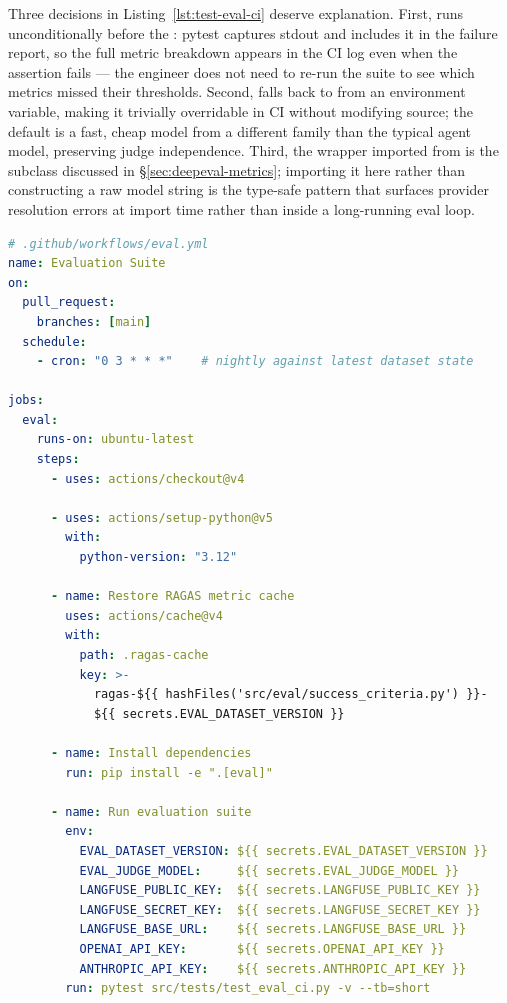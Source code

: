 Three decisions in Listing~\ref{lst:test-eval-ci} deserve explanation.
First,  runs unconditionally before the :
pytest captures stdout and includes it in the failure report, so the full
metric breakdown appears in the CI log even when the assertion fails --- the
engineer does not need to re-run the suite to see which metrics missed their
thresholds.  Second,  falls back to
 from an environment variable, making it trivially
overridable in CI without modifying source; the default is a fast, cheap
model from a different family than the typical agent model, preserving judge
independence.  Third, the  wrapper imported from
 is the  subclass discussed in
\S\ref{sec:deepeval-metrics}; importing it here rather than constructing a
raw model string is the type-safe pattern that surfaces provider resolution
errors at import time rather than inside a long-running eval loop.

\begin{lstlisting}[language=yaml, caption={GitHub Actions workflow: pinned
    dataset version and compound cache key},
    label={lst:eval-workflow}]
# .github/workflows/eval.yml
name: Evaluation Suite
on:
  pull_request:
    branches: [main]
  schedule:
    - cron: "0 3 * * *"    # nightly against latest dataset state

jobs:
  eval:
    runs-on: ubuntu-latest
    steps:
      - uses: actions/checkout@v4

      - uses: actions/setup-python@v5
        with:
          python-version: "3.12"

      - name: Restore RAGAS metric cache
        uses: actions/cache@v4
        with:
          path: .ragas-cache
          key: >-
            ragas-${{ hashFiles('src/eval/success_criteria.py') }}-
            ${{ secrets.EVAL_DATASET_VERSION }}

      - name: Install dependencies
        run: pip install -e ".[eval]"

      - name: Run evaluation suite
        env:
          EVAL_DATASET_VERSION: ${{ secrets.EVAL_DATASET_VERSION }}
          EVAL_JUDGE_MODEL:     ${{ secrets.EVAL_JUDGE_MODEL }}
          LANGFUSE_PUBLIC_KEY:  ${{ secrets.LANGFUSE_PUBLIC_KEY }}
          LANGFUSE_SECRET_KEY:  ${{ secrets.LANGFUSE_SECRET_KEY }}
          LANGFUSE_BASE_URL:    ${{ secrets.LANGFUSE_BASE_URL }}
          OPENAI_API_KEY:       ${{ secrets.OPENAI_API_KEY }}
          ANTHROPIC_API_KEY:    ${{ secrets.ANTHROPIC_API_KEY }}
        run: pytest src/tests/test_eval_ci.py -v --tb=short
\end{lstlisting}

